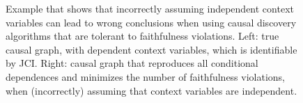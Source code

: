 \documentclass[twoside,11pt]{article}
\begin{document}
\begin{figure}
  \centering
  \caption{Example that shows that incorrectly assuming independent context variables can lead to wrong conclusions when using causal discovery algorithms that are tolerant to faithfulness violations. Left: true causal graph, with dependent context variables, which is identifiable by JCI. Right: causal graph that reproduces all conditional dependences and minimizes the number of faithfulness violations, when (incorrectly) assuming that context variables are independent.\label{fig:JCI_dependent_contexts}}
\end{figure}
\end{document}

